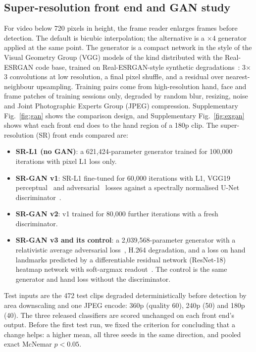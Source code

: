 \documentclass[pdflatex,sn-mathphys-num,twocolumn,lineno]{sn-jnl}
\theoremstyle{thmstyleone}%
\begin{document}
\subsection{Super-resolution front end and GAN study}\label{sec:method:sr}
For video below 720 pixels in height, the frame reader enlarges frames before detection. The default is bicubic interpolation; the alternative is a $\times4$ generator applied at the same point. The generator is a compact network in the style of the Visual Geometry Group (VGG) models of the kind distributed with the Real-ESRGAN code base, trained on Real-ESRGAN-style synthetic degradations~\cite{wang2021realesrgan}: 3$\times$3 convolutions at low resolution, a final pixel shuffle, and a residual over nearest-neighbour upsampling. Training pairs come from high-resolution hand, face and frame patches of training sessions only, degraded by random blur, resizing, noise and Joint Photographic Experts Group (JPEG) compression. Supplementary Fig.~\ref{fig:gan} shows the comparison design, and Supplementary Fig.~\ref{fig:exgan} shows what each front end does to the hand region of a 180p clip. The super-resolution (SR) front ends compared are:
\begin{itemize}
\item \textbf{SR-L1 (no GAN)}: a 621,424-parameter generator trained for 100,000 iterations with pixel L1 loss only.
\item \textbf{SR-GAN v1}: SR-L1 fine-tuned for 60,000 iterations with L1, VGG19 perceptual~\cite{johnson2016perceptual,simonyan2015vgg} and adversarial~\cite{goodfellow2014gan} losses against a spectrally normalised U-Net discriminator~\cite{schonfeld2020unetd,miyato2018sn}.
\item \textbf{SR-GAN v2}: v1 trained for 80,000 further iterations with a fresh discriminator.
\item \textbf{SR-GAN v3 and its control}: a 2,039,568-parameter generator with a relativistic average adversarial loss~\cite{jolicoeur2019ragan}, H.264 degradation, and a loss on hand landmarks predicted by a differentiable residual network (ResNet-18)~\cite{he2016resnet} heatmap network with soft-argmax readout~\cite{sun2018integral}. The control is the same generator and hand loss without the discriminator.
\end{itemize}
Test inputs are the 472 test clips degraded deterministically before detection by area downscaling and one JPEG encode: 360p (quality 60), 240p (50) and 180p (40). The three released classifiers are scored unchanged on each front end's output. Before the first test run, we fixed the criterion for concluding that a change helps: a higher mean, all three seeds in the same direction, and pooled exact McNemar $p<0.05$.
\end{document}
